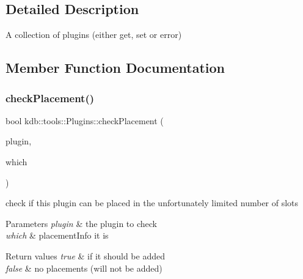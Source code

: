 \subsection{Detailed Description}
A collection of plugins (either get, set or error) 

\subsection{Member Function Documentation}
\mbox{\label{classkdb_1_1tools_1_1Plugins_ad2e5c69bacc5dcad0f8a8dd6ef5893f7}} 
\subsubsection{\texorpdfstring{checkPlacement()}{checkPlacement()}}
{\footnotesize\ttfamily bool kdb\+::tools\+::\+Plugins\+::check\+Placement (\begin{DoxyParamCaption}\item[{\mbox{\hyperlink{classkdb_1_1tools_1_1Plugin}{Plugin}} \&}]{plugin,  }\item[{std\+::string}]{which }\end{DoxyParamCaption})}



check if this plugin can be placed in the unfortunately limited number of slots 


\begin{DoxyParams}{Parameters}
{\em plugin} & the plugin to check \\
\hline
{\em which} & placement\+Info it is\\
\hline
\end{DoxyParams}

\begin{DoxyRetVals}{Return values}
{\em true} & if it should be added \\
\hline
{\em false} & no placements (will not be added) \\
\hline
\end{DoxyRetVals}
\mbox{\label{classkdb_1_1tools_1_1Plugins_a00b1abdf673cdfa24677c39b8e740981}} 
